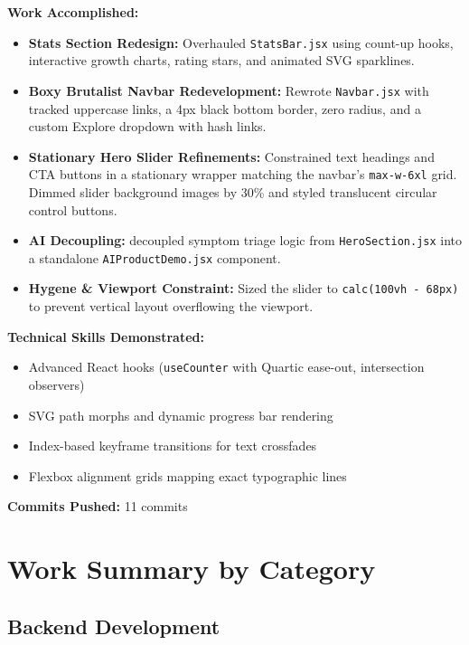 \documentclass[11pt,a4paper]{article}
\begin{document}
\begin{itemize}
{\textbf{Work Accomplished:}
\begin{itemize}
  \item \textbf{Stats Section Redesign:} Overhauled \texttt{StatsBar.jsx} using count-up hooks, interactive growth charts, rating stars, and animated SVG sparklines.
  \item \textbf{Boxy Brutalist Navbar Redevelopment:} Rewrote \texttt{Navbar.jsx} with tracked uppercase links, a 4px black bottom border, zero radius, and a custom Explore dropdown with hash links.
  \item \textbf{Stationary Hero Slider Refinements:} Constrained text headings and CTA buttons in a stationary wrapper matching the navbar's \texttt{max-w-6xl} grid. Dimmed slider background images by 30\% and styled translucent circular control buttons.
  \item \textbf{AI Decoupling:} decoupled symptom triage logic from \texttt{HeroSection.jsx} into a standalone \texttt{AIProductDemo.jsx} component.
  \item \textbf{Hygene \& Viewport Constraint:} Sized the slider to \texttt{calc(100vh - 68px)} to prevent vertical layout overflowing the viewport.
\end{itemize}

\textbf{Technical Skills Demonstrated:}
\begin{itemize}
  \item Advanced React hooks (\texttt{useCounter} with Quartic ease-out, intersection observers)
  \item SVG path morphs and dynamic progress bar rendering
  \item Index-based keyframe transitions for text crossfades
  \item Flexbox alignment grids mapping exact typographic lines
\end{itemize}

\textbf{Commits Pushed:} 11 commits

\newpage

\section{Work Summary by Category}

\subsection{Backend Development}

}
\end{itemize}
\end{document}
